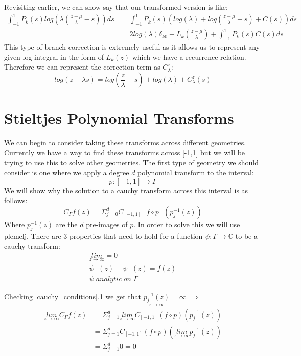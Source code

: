 \documentclass{article}
\begin{document}
Revisiting earlier, we can show say that our transformed version is like:
\begin{align}
    \int_{-1}^1P_k(s)log(\lambda(\frac{z-\mu}{\lambda}-s))ds&=\int_{-1}^1P_k(s)(log(\lambda)+log(\frac{z-\mu}{\lambda}-s)+C(s))ds\\
    &=2log(\lambda)\delta_{k0}+L_k(\frac{z-\mu}{\lambda})+\int_{-1}^1P_k(s)C(s)ds
\end{align}
This type of branch correction is extremely useful as it allows us to represent any given log integral in the form of $L_k(z)$ which we have a recurrence relation.
Therefore we can represent the correction term as $C_\lambda^z$:
\begin{equation}log(z-\lambda s)=log(\frac{z}{\lambda}-s)+log(\lambda)+C_\lambda^z(s)\label{branch_correct}\end{equation}

\section{Stieltjes Polynomial Transforms}
We can begin to consider taking these transforms across different geometries.
Currently we have a way to find these transforms across [-1,1] but we will be trying to use this to solve other geometries.
The first type of geometry we should consider is one where we apply a degree $d$ polynomial transform to the interval:
$$p:[-1,1]\rightarrow \Gamma$$
We will show why the solution to a cauchy transform across this interval is as follows:
\begin{equation}
C_\Gamma f(z) = \Sigma_{j=0}^dC_{[-1,1]}[f\circ p](p_j^{-1}(z))
\end{equation}
Where $p_j^{-1}(z)$ are the $d$ pre-images of $p$.
In order to solve this we will use plemelj.
There are 3 properties that need to hold for a function $\psi: \Gamma \rightarrow \mathbb{C}$ to be a cauchy transform:
\begin{equation}\label{cauchy_conditions}\begin{gathered}
\underset{z\to\infty}{lim}= 0 \\
\psi^+(z)-\psi^-(z)= f(z) \\
\psi\;analytic\;on\;\Gamma 
\end{gathered}\end{equation}

Checking \eqref{cauchy_conditions}.1 we get that $\underset{z\to\infty}{p_j^{-1}(z)} = \infty \implies$
\begin{equation}\begin{split}
\underset{z\to\infty}{lim}C_\Gamma f(z) &= \Sigma_{j=1}^d \underset{z\to\infty}{lim}C_{[-1,1]}(f\circ p)(p_j^{-1}(z)) \\
&= \Sigma_{j=1}^d C_{[-1,1]}(f\circ p)(\underset{z\to\infty}{lim} p_j^{-1}(z)) \\
&= \Sigma_{j=1}^d 0 = 0
\end{split}\end{equation}
\end{document}
